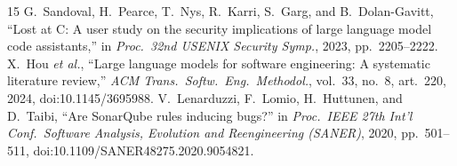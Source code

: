 \documentclass[conference]{IEEEtran}
\begin{document}
\begin{thebibliography}{15}
 G.~Sandoval, H.~Pearce, T.~Nys, R.~Karri, S.~Garg, and B.~Dolan-Gavitt, ``Lost at C: A user study on the security implications of large language model code assistants,'' in \emph{Proc.\ 32nd USENIX Security Symp.}, 2023, pp.~2205--2222.
 X.~Hou \textit{et al.}, ``Large language models for software engineering: A systematic literature review,'' \emph{ACM Trans.\ Softw.\ Eng.\ Methodol.}, vol.~33, no.~8, art.~220, 2024, doi:10.1145/3695988.
 V.~Lenarduzzi, F.~Lomio, H.~Huttunen, and D.~Taibi, ``Are SonarQube rules inducing bugs?'' in \emph{Proc.\ IEEE 27th Int'l Conf.\ Software Analysis, Evolution and Reengineering (SANER)}, 2020, pp.~501--511, doi:10.1109/SANER48275.2020.9054821.
\end{thebibliography}
\end{document}
